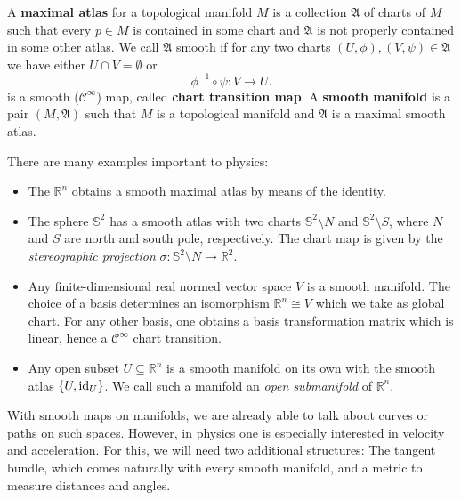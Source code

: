 \begin{definition}
    A \textbf{maximal atlas} for a topological manifold $M$ is a collection $\mathfrak{A}$ of charts of $M$ such that every $p \in M$ is contained in some chart and $\mathfrak{A}$ is not properly contained in some other atlas. We call $\mathfrak{A}$ smooth if for any two charts $(U,\phi),(V,\psi) \in \mathfrak{A}$ we have either $U \cap V = \emptyset$ or \[
        \phi^{-1} \circ \psi: V \to U
    .\] is a smooth ($\mathcal{C}^\infty$) map, called \textbf{chart transition map}. A \textbf{smooth manifold} is a pair $(M, \mathfrak{A})$ such that $M$ is a topological manifold and $\mathfrak{A}$ is a maximal smooth atlas.
\end{definition}
There are many examples important to physics:
\begin{eg}
    \begin{itemize}
        \item The $\mathbb{R}^n$ obtains a smooth maximal atlas by means of the identity.
        \item The sphere $\mathbb{S}^2$ has a smooth atlas with two charts $\mathbb{S}^2 \setminus N$ and $\mathbb{S}^2 \setminus S$, where $N$ and $S$ are north and south pole, respectively. The chart map is given by the \emph{stereographic projection} $\sigma: \mathbb{S}^2 \setminus N \to \mathbb{R}^2$. 
        \item Any finite-dimensional real normed vector space $V$ is a smooth manifold. The choice of a basis determines an isomorphism $\mathbb{R}^n \cong V$ which we take as global chart. For any other basis, one obtains a basis transformation matrix which is linear, hence a $\mathcal{C}^\infty$ chart transition.
        \item Any open subset $U \subseteq \mathbb{R}^n$ is a smooth manifold on its own with the smooth atlas $\{U, \operatorname{id}_U\}$. We call such a manifold an \emph{open submanifold} of $\mathbb{R}^n$.
    \end{itemize}
\end{eg}
With smooth maps on manifolds, we are already able to talk about curves or paths on such spaces. However, in physics one is especially interested in velocity and acceleration. For this, we will need two additional structures: The tangent bundle, which comes naturally with every smooth manifold, and a metric to measure distances and angles.

